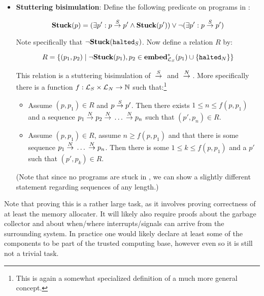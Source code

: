 \begin{itemize}
\item \textbf{Stuttering bisimulation}: Define the following predicate on
  programs in \simplelang:

  $$\mathbf{Stuck}(p) = (\exists p': p {{}\stackrel{S}{->}{}} p' \land \mathbf{Stuck}(p')) \lor \neg(\exists p': p {{}\stackrel{S}{->}{}} p')$$

  Note specifically that $\neg\mathbf{Stuck}({\mathtt{halted}_S})$. Now define a relation $R$
  by:

  $$R = \{(p_1, p_2) \mid \neg\mathbf{Stuck}(p_1), p_2 \in \mathbf{embed}^\ast_{\mathcal{L}_S}(p_1) \cup \{{\mathtt{halted}_N}\}\}$$

  This relation is a stuttering bisimulation of ${{}\stackrel{S}{->}{}}$ and
  ${{}\stackrel{N}{->}{}}$. More specifically there is a function
  $f : \mathcal{L}_S \times \mathcal{L}_N \to \mathbb{N}$ such that:\footnote{This
    is again a somewhat specialized definition of a much more general concept.}

  \begin{itemize}
  \item Assume $(p, p_1) \in R$ and $p {{}\stackrel{S}{->}{}} p'$. Then there exists
    $1 \leq n \leq f(p, p_1)$ and a sequence
    $p_1 {{}\stackrel{N}{->}{}} p_2 {{}\stackrel{N}{->}{}} \dots {{}\ensuremath{\stackrel{N}{->}}{}} p_n$ such that
    $(p', p_n) \in R$.
  \item Assume $(p, p_1) \in R$, assume $n \geq f(p, p_1)$ and that there is
    some sequence $p_1 {{}\stackrel{N}{->}{}} \dots {{}\ensuremath{\stackrel{N}{->}}{}} p_n$. Then there is some
    $1 \leq k \leq f(p, p_1)$ and a $p'$ such that $(p', p_k) \in R$.
  \end{itemize}

  (Note that since no programs are stuck in \nativelang, we can show a slightly
  different statement regarding sequences of any length.)
\end{itemize}

Note that proving this is a rather large task, as it involves proving
correctness of at least the memory allocater. It will likely also require proofs
about the garbage collector and about when/where interrupts/signals can arrive
from the surrounding system. In practice one would likely declare at least some
of the components to be part of the trusted computing base, however even so it
is still not a trivial task.

